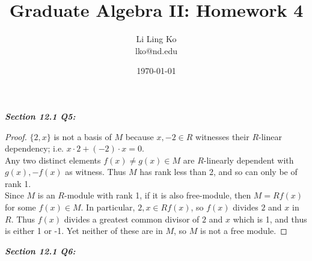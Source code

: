 \documentclass{article}
\begin{document}
\title{Graduate Algebra II: Homework 4}
\author{Li Ling Ko\\ lko@nd.edu}
\date{\today}
\maketitle

\it \textbf{Section 12.1 Q5:}
  \begin{proof}
    $\{2,x\}$ is not a basis of $M$ because $x,-2\in R$ witnesses their
    $R$-linear dependency; i.e. $x\cdot2+(-2)\cdot x=0$. \\

    Any two distinct elements $f(x)\neq g(x)\in M$ are $R$-linearly
    dependent with $g(x),-f(x)$ as witness. Thus $M$ has rank less than 2,
    and so can only be of rank 1. \\

    Since $M$ is an $R$-module with rank 1, if it is also free-module, then
    $M=Rf(x)$ for some $f(x)\in M$. In particular, $2,x\in Rf(x)$, so
    $f(x)$ divides $2$ and $x$ in $R$. Thus $f(x)$ divides a greatest
    common divisor of $2$ and $x$ which is 1, and thus is either 1 or -1.
    Yet neither of these are in $M$, so $M$ is not a free module.
  \end{proof}

\it \textbf{Section 12.1 Q6:}
\end{document}
